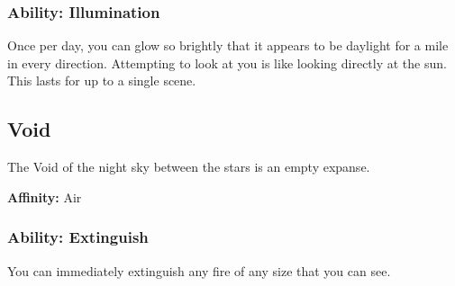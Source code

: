 \begin{multicols}{2}
\subsubsection{Ability: Illumination}

Once per day, you can glow so brightly that it appears to be daylight
for a mile in every direction. Attempting to look at you is like looking
directly at the sun. This lasts for up to a single scene.

\subsection{Void}

The Void of the night sky between the stars is an empty expanse.

\textbf{Affinity:} Air

\subsubsection{Ability: Extinguish}

You can immediately extinguish any fire of any size that you can see.

\end{multicols}
